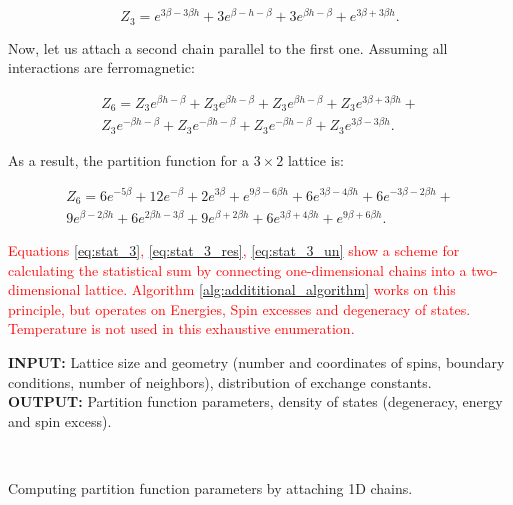 \documentclass[preprint,12pt]{elsarticle}
\begin{document}
\begin{equation}
	Z_3 = e^{3\beta - 3\beta h} + 3e^{\beta - h - \beta} + 3e^{\beta h - \beta} + e^{3\beta + 3\beta h}.
	\label{eq:stat_3}
\end{equation}

Now, let us attach a second chain parallel to the first one. Assuming all interactions are ferromagnetic:

\begin{equation}
	\label{eq:stat_3_un}
	\begin{alignedat}{2}
		Z_6 = Z_3 e^{\beta h-\beta} + Z_3 e^{\beta h-\beta} + Z_3 e^{\beta h-\beta} + Z_3 e^{3 \beta +3 \beta h} + \\
		Z_3 e^{-\beta h-\beta} + Z_3 e^{-\beta h-\beta} + Z_3 e^{-\beta h-\beta} + Z_3 e^{3 \beta -3 \beta h}.
	\end{alignedat}
\end{equation}

As a result, the partition function for a $3 \times 2$ lattice is:

\begin{equation}
	\label{eq:stat_3_res}
	\begin{alignedat}{2}
		Z_6 = 6 e^{-5 \beta } + 12 e^{-\beta } + 2 e^{3 \beta } + e^{9 \beta -6 \beta  h} + 6 e^{3 \beta -4 \beta  h} + 6 e^{-3 \beta -2 \beta  h} + \\
		9 e^{\beta -2 \beta  h} + 6 e^{2 \beta  h-3 \beta } + 9 e^{\beta +2 \beta  h} + 6 e^{3 \beta +4 \beta  h} + e^{9 \beta +6 \beta  h}.
	\end{alignedat}
\end{equation}

\textcolor{red}{Equations \ref{eq:stat_3}, \ref{eq:stat_3_res}, \ref{eq:stat_3_un} show a scheme for calculating the statistical sum by connecting one-dimensional chains into a two-dimensional lattice. Algorithm \ref{alg:addititional_algorithm} works on this principle, but operates on Energies, Spin excesses and degeneracy of states. Temperature is not used in this exhaustive enumeration.}

\begin{algorithm}[H]
	\textbf{INPUT:} Lattice size and geometry (number and coordinates of spins, boundary conditions, number of neighbors), distribution of exchange constants.\\
	\textbf{OUTPUT:} Partition function parameters, density of states (degeneracy, energy and spin excess).
	\begin{algorithmic}
		{
			{
			}
			\ENDFOR \\
		}
		\ENDFOR
	\end{algorithmic}
	\caption{Computing partition function parameters by attaching 1D chains.}
	\label{alg:addititional_algorithm}
\end{algorithm}
\end{document}
